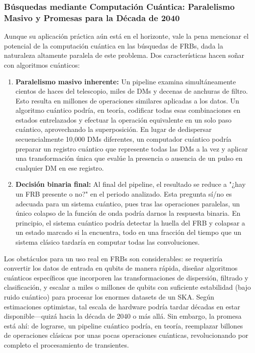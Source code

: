 \subsubsection{Búsquedas mediante Computación Cuántica: Paralelismo Masivo y Promesas para la Década de 2040}

Aunque su aplicación práctica aún está en el horizonte, vale la pena mencionar el potencial de la computación cuántica en las búsquedas de FRBs, dada la naturaleza altamente paralela de este problema. Dos características hacen soñar con algoritmos cuánticos:

\begin{enumerate}
    \item \textbf{Paralelismo masivo inherente:} Un pipeline examina simultáneamente cientos de haces del telescopio, miles de DMs y decenas de anchuras de filtro. Esto resulta en millones de operaciones similares aplicadas a los datos. Un algoritmo cuántico podría, en teoría, codificar todas esas combinaciones en estados entrelazados y efectuar la operación equivalente en un solo paso cuántico, aprovechando la superposición. En lugar de dedispersar secuencialmente 10,000 DMs diferentes, un computador cuántico podría preparar un registro cuántico que represente todas las DMs a la vez y aplicar una transformación única que evalúe la presencia o ausencia de un pulso en cualquier DM en ese registro.
    
    \item \textbf{Decisión binaria final:} Al final del pipeline, el resultado se reduce a "¿hay un FRB presente o no?" en el periodo analizado. Esta pregunta sí/no es adecuada para un sistema cuántico, pues tras las operaciones paralelas, un único colapso de la función de onda podría darnos la respuesta binaria. En principio, el sistema cuántico podría detectar la huella del FRB y colapsar a un estado marcado si la encuentra, todo en una fracción del tiempo que un sistema clásico tardaría en computar todas las convoluciones.
\end{enumerate}

Los obstáculos para un uso real en FRBs son considerables: se requeriría convertir los datos de entrada en qubits de manera rápida, diseñar algoritmos cuánticos específicos que incorporen las transformaciones de dispersión, filtrado y clasificación, y escalar a miles o millones de qubits con suficiente estabilidad (bajo ruido cuántico) para procesar los enormes datasets de un SKA. Según estimaciones optimistas, tal escala de hardware podría tardar décadas en estar disponible—quizá hacia la década de 2040 o más allá. Sin embargo, la promesa está ahí: de lograrse, un pipeline cuántico podría, en teoría, reemplazar billones de operaciones clásicas por unas pocas operaciones cuánticas, revolucionando por completo el procesamiento de transientes.

